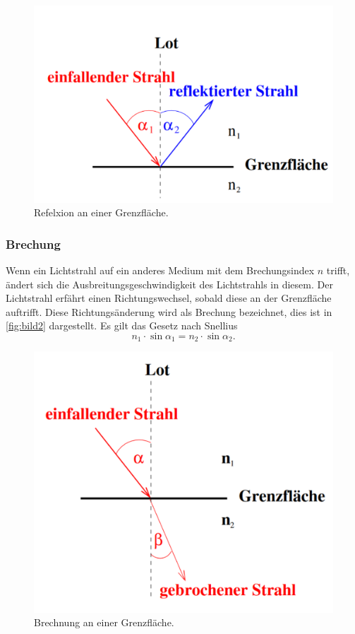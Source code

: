    \begin{figure}[H]
    \centering
	\includegraphics[width=0.6\linewidth]{content/grafik/reflexion.png}
	\caption{Refelxion an einer Grenzfläche. \cite{reflex}}
	\label{fig:bild1}
\end{figure}

\subsubsection{Brechung}
\label{sec:Brechung}
Wenn ein Lichtstrahl auf ein anderes Medium mit dem Brechungsindex $n$ trifft, ändert sich die Ausbreitungsgeschwindigkeit
des Lichtstrahls in diesem. Der Lichtstrahl erfährt einen Richtungswechsel, sobald diese an der Grenzfläche auftrifft.
Diese Richtungsänderung wird als Brechung bezeichnet, dies ist in \autoref{fig:bild2} dargestellt. Es gilt das Gesetz nach Snellius
\begin{equation}
  n_1  \cdot \sin \alpha_1 = n_2 \cdot \sin \alpha_2.
\end{equation}

\begin{figure}[H]
    \centering
	\includegraphics[width=0.6\linewidth]{content/grafik/brechung.png}
	\caption{Brechnung an einer Grenzfläche. \cite{reflex}}
	\label{fig:bild2}
\end{figure}

